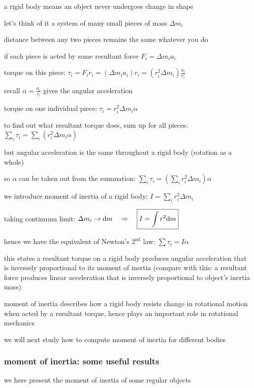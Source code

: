 a rigid body means an object never undergoes change in shape

let's think of it a system of many small pieces of mass $\Delta m_i$

distance between any two pieces remains the same whatever you do

if each piece is acted by some resultant force $F_i = \Delta m_i a_i$

torque on this piece: $\tau_i = F_i r_i = (\Delta m_i a_i) r_i = (r_i^2 \Delta m_i)\frac{a_i}{r_i}$

recall $\alpha = \frac{a_i}{r_i}$ gives the angular acceleration

torque on one individual piece: $ \tau_i =  r_i^2 \Delta m_i  \alpha $

to find out what resultant torque does, sum up for all pieces: $\sum_i \tau_i = \sum_i (r_i^2 \Delta m_i \alpha)$

but angular acceleration is the same throughout a rigid body (rotation as a whole)

so $\alpha$ can be taken out from the summation: $ \sum_i \tau_i = \left(\sum_i r_i^2 \Delta m_i\right) \alpha$

\vspace*{\baselineskip}

we introduce moment of inertia of a rigid body: $\boxed{I = \sum_i r_i^2 \Delta m_i}$

taking continuum limit: $\Delta m_i \to \mathrm{d} m \quad \Rightarrow \quad \boxed{I = \int r^2 \mathrm{d} m}$

hence we have the equivalent of Newton's $2^\text{nd}$ law: $\boxed{\sum \tau_i = I \alpha}$

this states a resultant torque on a rigid body produces angular acceleration that is inversely proportional to its moment of inertia (compare with this: a resultant force produces linear acceleration that is inversely proportional to object's inertia mass)

moment of inertia describes how a rigid body resists change in rotational motion when acted by a resultant torque, hence plays an important role in rotational mechanics

we will next study how to compute moment of inertia for different bodies

\subsubsection{moment of inertia: some useful results}

we here present the moment of inertia of some regular objects 

